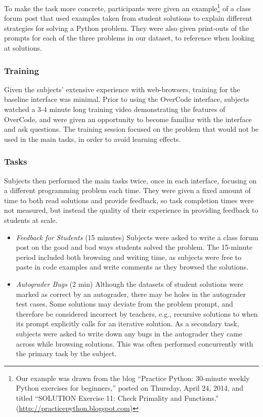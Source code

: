 To make the task more concrete, participants were given an example\footnote{Our example was drawn from the blog ``Practice Python: 30-minute weekly Python exercises for beginners,'' posted on Thursday, April 24, 2014, and titled ``SOLUTION Exercise 11: Check Primality and Functions.'' (\url{http://practicepython.blogspot.com})} of a class forum post that used examples taken from student solutions to explain different strategies for solving a Python problem. They were also given print-outs of the prompts for each of the three problems in our dataset, to reference when looking at solutions.\subsubsection{Training}

Given the subjects' extensive experience with web-browsers, training for the baseline interface was minimal. Prior to using the OverCode interface, subjects watched a 3-4 minute long training video demonstrating the features of OverCode, and were given an opportunity to become familiar with the interface and ask questions. The training session focused on the problem that would not be used in the main tasks, in order to avoid learning effects.

\subsubsection{Tasks}
Subjects then performed the main tasks twice, once in each interface, focusing on a different programming problem each time. They were given a fixed amount of time to both read solutions and provide feedback, so task completion times were not measured, but instead the quality of their experience in providing feedback to students at scale.

\begin{itemize}
\item {\it Feedback for Students} (15 minutes) Subjects were asked to write a class forum post on the good and bad ways students solved the problem. The 15-minute period included both browsing and writing time, as subjects were free to paste in code examples and write comments as they browsed the solutions.

\item {\it Autograder Bugs} (2 min) Although the datasets of student solutions were marked as correct by an autograder, there may be holes in the autograder test cases. Some solutions may deviate from the problem prompt, and therefore be considered incorrect by teachers, e.g., recursive solutions to  when its prompt explicitly calls for an iterative solution. As a secondary task, subjects were asked to write down any bugs in the autograder they came across while browsing solutions. This was often performed concurrently with the primary task by the subject.
\end{itemize}
